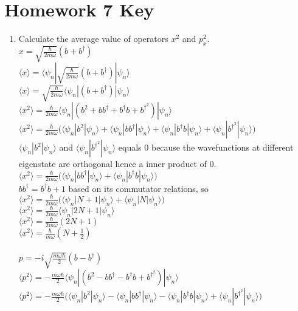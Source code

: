 \documentclass{article}
\begin{document}
\section*{Homework 7 Key}
 
\begin{enumerate}%
    \item Calculate the average value of operators $x^2$ and $p_x^2$.
    \\ $x=\sqrt{\frac{\hbar}{2m\omega}}(b+b^\dagger)$
    \\ $\langle x\rangle=\langle\psi_n|\sqrt{\frac{\hbar}{2m\omega}}(b+b^\dagger)|\psi_n\rangle$
    \\ $\langle x\rangle=\sqrt{\frac{\hbar}{2m\omega}}\langle\psi_n|(b+b^\dagger)|\psi_n\rangle$
    \\ $\langle x^2\rangle=\frac{\hbar}{2m\omega}\langle\psi_n|(b^2+bb^\dagger+b^\dagger b+b^\dagger^2)|\psi_n\rangle$
    \\ $\langle x^2\rangle=\frac{\hbar}{2m\omega}\Big(\langle\psi_n|b^2|\psi_n\rangle +\langle\psi_n|bb^\dagger|\psi_n\rangle +\langle\psi_n|b^\dagger b|\psi_n\rangle+\langle\psi_n|b^\dagger^2|\psi_n\rangle\Big)$
    \\ $\langle\psi_n|b^2|\psi_n\rangle$ and $\langle\psi_n|b^\dagger^2|\psi_n\rangle$ equals 0 because the wavefunctions at different eigenstate are orthogonal hence a inner product of 0.
    \\ $\langle x^2\rangle=\frac{\hbar}{2m\omega}\Big(\langle\psi_n|bb^\dagger|\psi_n\rangle +\langle\psi_n|b^\dagger b|\psi_n\rangle\Big)$
    \\ $bb^\dagger = b^\dagger b +1$ based on its commutator relations, so
    \\ $\langle x^2\rangle=\frac{\hbar}{2m\omega}\Big(\langle\psi_n|N+1|\psi_n\rangle +\langle\psi_n|N|\psi_n\rangle\Big)$
    \\ $\langle x^2\rangle=\frac{\hbar}{2m\omega}\langle\psi_n|2N+1|\psi_n\rangle$
    \\ $\langle x^2\rangle=\frac{\hbar}{2m\omega}(2N+1)$
    \\ $\langle x^2\rangle=\frac{\hbar}{m\omega}(N+\frac{1}{2})$
    \\
    \\ $p=-i\sqrt{\frac{m\omega\hbar}{2}}(b-b^\dagger)$
    \\ $\langle p^2\rangle = -\frac{m\omega\hbar}{2}\langle\psi_n|(b^2-bb^\dagger-b^\dagger b+b^\dagger^2)|\psi_n\rangle$
    \\ $\langle p^2\rangle=-\frac{m\omega\hbar}{2}\Big(\langle\psi_n|b^2|\psi_n\rangle -\langle\psi_n|bb^\dagger|\psi_n\rangle -\langle\psi_n|b^\dagger b|\psi_n\rangle+\langle\psi_n|b^\dagger^2|\psi_n\rangle\Big)$

\end{enumerate}
\end{document}
